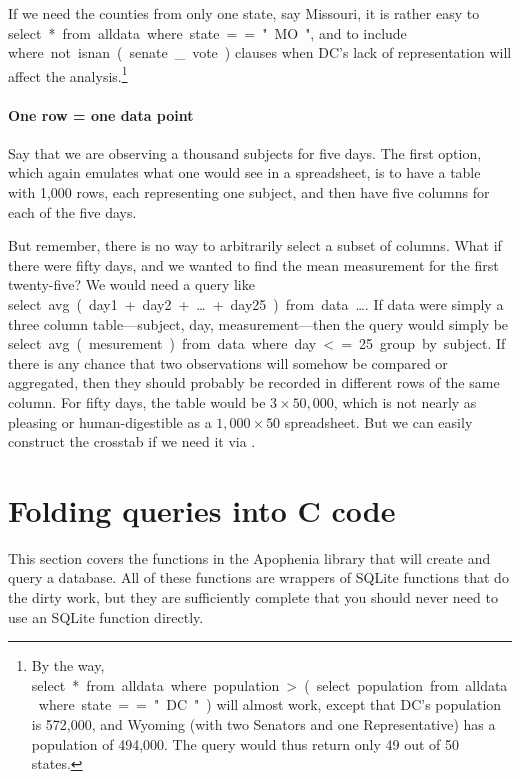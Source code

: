 If we need the counties from only one state, say Missouri, it is
rather easy to \si{select * from alldata where state=="MO"}, and to
include \si{where not isnan(senate\_vote)} clauses when DC's lack of
representation will affect the analysis.\footnote{By the way, \si{select
* from alldata where population > (select population from alldata where
state == "DC")} will almost work, except that DC's
population is 572,000, and Wyoming (with two Senators and one
Representative) has a population of 494,000. The query would thus return
only 49 out of 50 states.}

\paragraph{One row = one data point} Say that we are observing a
thousand subjects for five days. The first option, which again emulates
what one would see in a spreadsheet, is to have a table with 1,000
rows, each representing one subject, and then have five columns for each
of the five days. 

But remember, there is no way to arbitrarily select a subset of columns.
What if there were fifty days, and we wanted to find the mean measurement for the first
twenty-five? We would need a query like \si{select avg(day1 + day2 +
\dots + day25) from data \dots}. If \si{data} were simply a three column table---\si{subject}, \si{day}, \si{measurement}---then the query would simply be
\si{select avg(mesurement) from data where day <=25 group by subject}. If there is any
chance that two observations will somehow be compared or aggregated,
then they should probably be recorded in different rows of the same
column. For fifty days, the table would be $3 \times 50,000$, which
is not nearly as pleasing or human-digestible as a $1,000 \times 50$
spreadsheet. But we can easily construct the crosstab if we need it
via .


\section{Folding queries into C code}\label{foldingsql}  This section
covers the functions in the Apophenia library that will create and query
a database. All of these functions are wrappers of SQLite functions that
do the dirty work, but they are sufficiently complete that you should
never need to use an SQLite function directly.

